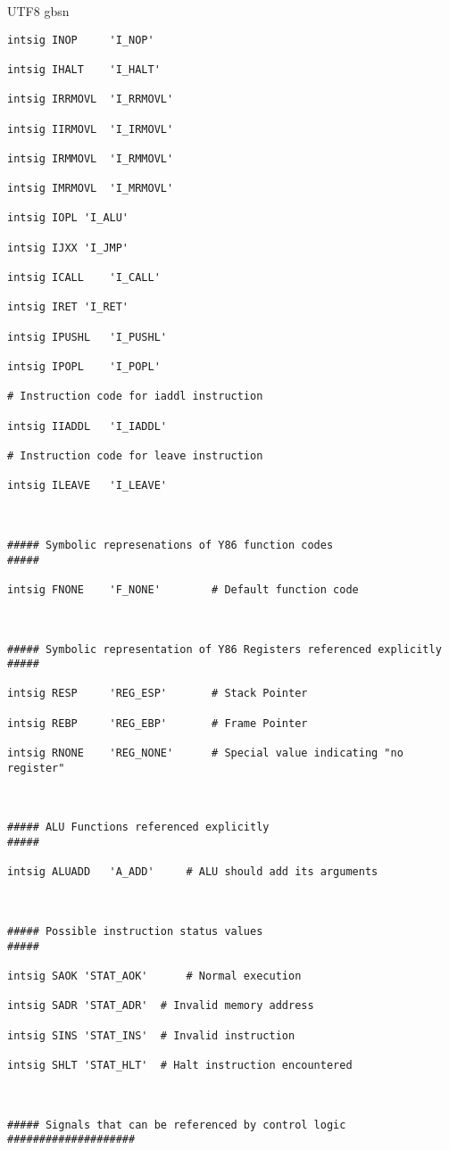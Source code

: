 \documentclass {article}
\begin{document}
\begin {CJK*} {UTF8} {gbsn}
\begin{lstlisting}
intsig INOP 	'I_NOP'

intsig IHALT	'I_HALT'

intsig IRRMOVL	'I_RRMOVL'

intsig IIRMOVL	'I_IRMOVL'

intsig IRMMOVL	'I_RMMOVL'

intsig IMRMOVL	'I_MRMOVL'

intsig IOPL	'I_ALU'

intsig IJXX	'I_JMP'

intsig ICALL	'I_CALL'

intsig IRET	'I_RET'

intsig IPUSHL	'I_PUSHL'

intsig IPOPL	'I_POPL'

# Instruction code for iaddl instruction

intsig IIADDL	'I_IADDL'

# Instruction code for leave instruction

intsig ILEAVE	'I_LEAVE'



##### Symbolic represenations of Y86 function codes                  #####

intsig FNONE    'F_NONE'        # Default function code



##### Symbolic representation of Y86 Registers referenced explicitly #####

intsig RESP     'REG_ESP'    	# Stack Pointer

intsig REBP     'REG_EBP'    	# Frame Pointer

intsig RNONE    'REG_NONE'   	# Special value indicating "no register"



##### ALU Functions referenced explicitly                            #####

intsig ALUADD	'A_ADD'		# ALU should add its arguments



##### Possible instruction status values                             #####

intsig SAOK	'STAT_AOK'		# Normal execution

intsig SADR	'STAT_ADR'	# Invalid memory address

intsig SINS	'STAT_INS'	# Invalid instruction

intsig SHLT	'STAT_HLT'	# Halt instruction encountered



##### Signals that can be referenced by control logic ####################




\end{lstlisting}
\end{CJK*}
\end{document}
